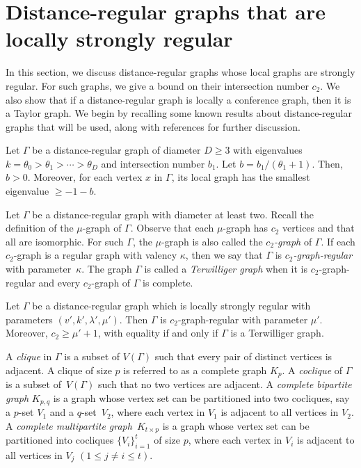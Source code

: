\section{Distance-regular graphs that are locally strongly regular}\label{sec:DRG locally SRG}
In this section, we discuss distance-regular graphs whose local graphs are strongly regular.
For such graphs, we give a bound on their intersection number $c_2$.
We also show that if a distance-regular graph is locally a conference graph, then it is a Taylor graph.
We begin by recalling some known results about distance-regular graphs that will be used, along with references for further discussion.


\begin{lemm}\label{lem:local min eig}
Let $\Gamma$ be a distance-regular graph of diameter $D\geqslant 3$ with eigenvalues $k=\theta_0 > \theta_1 >\cdots > \theta_D$ and intersection number $b_1$.
Let $b = b_1/(\theta_1+1)$.
Then, $b >0$.
Moreover, for each vertex $x$ in $\Gamma$, its local graph has the smallest eigenvalue $\geqslant -1-b$.
\end{lemm}


Let $\Gamma$ be a distance-regular graph with diameter at least two.
Recall the definition of the $\mu$-graph of $\Gamma$.
Observe that each $\mu$-graph has $c_2$ vertices and that all are isomorphic. 
For such $\Gamma$, the $\mu$-graph is also called the \emph{$c_2$-graph} of $\Gamma$.
If each $c_2$-graph is a regular graph with valency $\kappa$, then we say that $\Gamma$ is \emph{$c_2$-graph-regular} with parameter~$\kappa$.
The graph $\Gamma$ is called a \emph{Terwilliger graph} when it is $c_2$-graph-regular and every $c_2$-graph of $\Gamma$ is complete.

\begin{lemm}[{cf.~\cite[Theorem 3.1]{JK2000-2}}]\label{mu-regular}
Let $\Gamma$ be a distance-regular graph which is locally strongly regular with parameters $(v',k',\lambda', \mu')$. 
Then $\Gamma$ is $c_2$-graph-regular with parameter $\mu'$.
Moreover, $c_2 \geqslant \mu'+1$, with equality if and only if $\Gamma$ is a Terwilliger graph.
\end{lemm}

A \emph{clique} in $\Gamma$ is a subset of $V(\Gamma)$ such that every pair of distinct vertices is adjacent. A clique of size $p$ is referred to as a complete graph $K_p$.
A \emph{coclique} of $\Gamma$ is a subset of~$V(\Gamma)$ such that no two vertices are adjacent. 
A \emph{complete bipartite graph} $K_{p,q}$ is a graph whose vertex set can be partitioned into two cocliques, say a $p$-set $V_1$ and a $q$-set~$V_2$, where each vertex in $V_1$ is adjacent to all vertices in $V_2$.
A \emph{complete multipartite graph}~$K_{t \times p}$ is a graph whose vertex set can be partitioned into cocliques $\{V_i\}^t_{i=1}$ of size $p$, where each vertex in $V_i$ is adjacent to all vertices in $V_j$ $(1\leq j\ne i \leq t)$.

